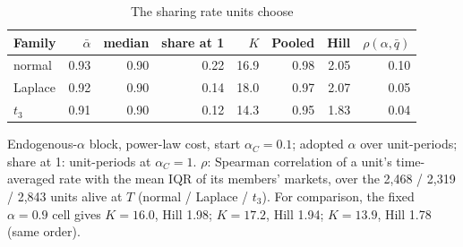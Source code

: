 \begin{table}[htbp]
\centering
\caption{The sharing rate units choose}
\label{tab:endogenous}
\small
\begin{tabular}{lrrrrrrr}
\toprule
Family & $\bar\alpha$ & median & share at 1 & $K$ & Pooled & Hill & $\rho(\alpha, \bar q)$ \\
\midrule
normal & 0.93 & 0.90 & 0.22 & 16.9 & 0.98 & 2.05 & 0.10 \\
Laplace & 0.92 & 0.90 & 0.14 & 18.0 & 0.97 & 2.07 & 0.05 \\
$t_3$ & 0.91 & 0.90 & 0.12 & 14.3 & 0.95 & 1.83 & 0.04 \\
\bottomrule
\end{tabular}
\par\smallskip\begin{minipage}{0.95\linewidth}\footnotesize Endogenous-$\alpha$ block, power-law cost, start $\alpha_C = 0.1$; adopted $\alpha$ over unit-periods; share at 1: unit-periods at $\alpha_C = 1$. $\rho$: Spearman correlation of a unit's time-averaged rate with the mean IQR of its members' markets, over the 2,468 / 2,319 / 2,843 units alive at $T$ (normal / Laplace / $t_3$). For comparison, the fixed $\alpha = 0.9$ cell gives $K = 16.0$, Hill 1.98; $K = 17.2$, Hill 1.94; $K = 13.9$, Hill 1.78 (same order).\end{minipage}
\end{table}
